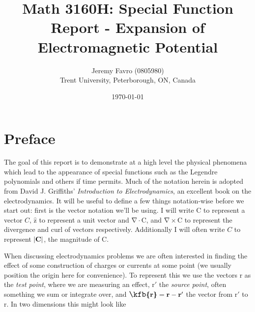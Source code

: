 \documentclass[10pt, twocolumn]{article}
\title{Math 3160H: Special Function Report - Expansion of Electromagnetic Potential}
\author{Jeremy Favro (0805980) \\ Trent University, Peterborough, ON, Canada}
\date{\today}
\theoremstyle{definition}
\newcommand{\bv}[1]{\bm{\mathrm{#1}}}
\newcommand{\uv}[1]{\hat{\bv{{#1}}}}
\newcommand{\bscriptr}{\fontsize{12pt}{12pt}\kfb{r}\fontsize{10pt}{10pt}}
\begin{document}
\maketitle
\section*{Preface}
The goal of this report is to demonstrate at a high level the physical phenomena which lead to the appearance of special functions such as the Legendre polynomials
and others if time permits. Much of the notation herein is adopted from David J. Griffiths' \emph{Introduction to Electrodynamics}, an
excellent book on the electrodynamics. It will be useful to define a few things notation-wise before we start out: first is the vector notation we'll be using. I will write
$\bv{C}$ to represent a vector $C$, $\uv{z}$ to represent a unit vector and $\bv{\nabla}\cdot\bv{C}$, and $\bv{\nabla}\times \bv{C}$ to represent the divergence and curl of vectors respectively.
Additionally I will often write $C$ to represent $\abs{\bv{C}}$, the magnitude of $\bv{C}$.


When discussing electrodynamics problems we are often interested in finding the effect of some construction of charges or currents at some point (we usually
position the origin here for convenience). To represent this we use the vectors $\bv{r}$ as the \emph{test point}, where we are measuring an effect,
$\bv{r}'$ the \emph{source point}, often something we sum or integrate over, and $\bv{\bscriptr}=\bv{r}-\bv{r}'$ the vector from $\bv{r}'$ to $\bv{r}$. In two dimensions
this might look like
\begin{center}
\end{center}
\end{document}
